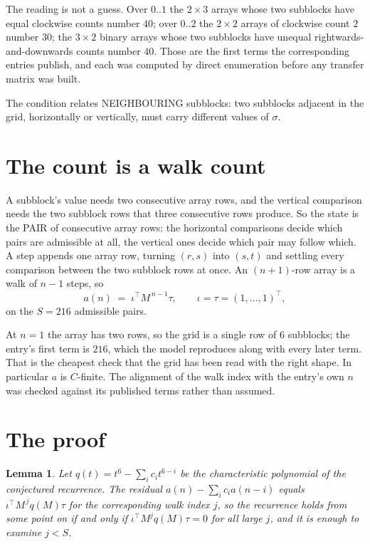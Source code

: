 \documentclass[11pt,a4paper]{article}
\theoremstyle{plain}
\newtheorem{lemma}[theorem]{Lemma}
\theoremstyle{definition}
\begin{document}
The reading is not a guess. Over $0..1$ the $2\times3$ arrays whose two subblocks have equal
clockwise counts number $40$; over $0..2$ the $2\times2$ arrays of clockwise count $2$ number
$30$; the $3\times2$ binary arrays whose two subblocks have unequal rightwards-and-downwards
counts number $40$. Those are the first terms the corresponding entries publish, and each was
computed by direct enumeration before any transfer matrix was built.

The condition relates NEIGHBOURING subblocks: two subblocks adjacent in the grid, horizontally
or vertically, must carry different values of $\sigma$.

\section{The count is a walk count}

A subblock's value needs two consecutive array rows, and the vertical
comparison needs the two subblock rows that three consecutive rows produce. So the state is the
PAIR of consecutive array rows: the horizontal comparisons decide which pairs are admissible at
all, the vertical ones decide which pair may follow which. A step appends one array row,
turning $(r,s)$ into $(s,t)$ and settling every comparison between the two subblock rows at
once. An $(n+1)$-row array is a walk of $n-1$ steps, so
\[
a(n)\;=\;\iota^{\!\top}M^{\,n-1}\tau,\qquad\iota=\tau=(1,\dots,1)^{\!\top},
\]
on the $S=216$ admissible pairs.

At $n=1$ the array has two rows, so the grid is a single row of $6$
subblocks; the entry's first term is $216$, which the model
reproduces along with every later term. That is the cheapest check that the grid has been read
with the right shape.
In particular $a$ is $C$-finite. The alignment of the walk index with the entry's own $n$ was
checked against its published terms rather than assumed.

\section{The proof}

\begin{lemma}\label{lem:crit}
Let $q(t)=t^{6}-\sum_i c_it^{6-i}$ be the characteristic polynomial of the
conjectured recurrence. The residual $a(n)-\sum_ic_ia(n-i)$ equals
$\iota^{\!\top}M^{\,j}q(M)\tau$ for the corresponding walk index $j$, so the recurrence
holds from some point on if and only if $\iota^{\!\top}M^{j}q(M)\tau=0$ for all large $j$,
and it is enough to examine $j<S$.
\end{lemma}
\end{document}
